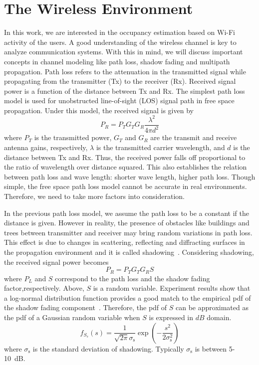 \section{The Wireless Environment}

In this work, we are interested in the occupancy estimation based on Wi-Fi activity of the users.
A good understanding of the wireless channel is key to analyze communication systems.
With this in mind, we will discuss important concepts in channel modeling like path loss, shadow fading and multipath propagation.
Path loss refers to the attenuation in the transmitted signal while propagating from the transmitter (Tx) to the receiver (Rx).
Received signal power is a function of the distance between Tx and Rx.
The simplest path loss model is used for unobstructed line-of-sight (LOS) signal path in free space propagation.
Under this model, the received signal is given by
\begin{equation}
P_{R} = P_{T} G_{T} G_{R} \frac{\lambda^2}{4 \pi d^2}
\end{equation}
where $P_{T}$ is the transmitted power, $G_{T}$ and $G_{R}$ are the transmit and receive antenna gains, respectively, $\lambda$ is the transmitted carrier wavelength, and $d$ is the distance between Tx and Rx.
Thus, the received power falls off proportional to the ratio of wavelength over distance squared.
This also establishes the relation between path loss and wave length: shorter wave length, higher path loss.
Though simple, the free space path loss model cannot be accurate in real environments.
Therefore, we need to take more factors into consideration.

In the previous path loss model, we assume the path loss to be a constant if the distance is given.
However in reality, the presence of obstacles like buildings and trees between transmitter and receiver may bring random variations in path loss.
This effect is due to changes in scattering, reflecting and diffracting surfaces in the propagation environment and it is called shadowing~\cite{rappaport1996wireless}.
Considering shadowing, the received signal power becomes
\begin{equation}
P_{R} = P_{T} G_{T} G_{R} S
\end{equation}
where $P_{L}$ and $S$ correspond to the path loss and the shadow fading factor,respectively.
Above, $S$ is a random variable.
Experiment results show that a log-normal distribution function provides a good match to the empirical pdf of the shadow fading component~\cite{bertoni1999radio}.
Therefore, the pdf of $S$ can be approximated as the pdf of a Gaussian random variable when $S$ is expressed in $dB$ domain.
\begin{equation} 
f_{S_{s}} (s)
= \frac{1}{\sqrt{2 \pi} \sigma_{\mathrm{s}}} 
\exp \left( - \frac{s^2}{2 \sigma_{\mathrm{s}}^2} \right)
\end{equation}
where $\sigma_{\mathrm{s}}$ is the standard deviation of shadowing. Typically $\sigma_{\mathrm{s}}$ is between 5-10~dB.

